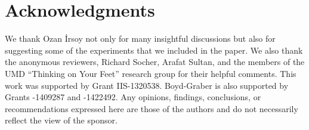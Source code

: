 \section*{Acknowledgments}
We thank Ozan \.Irsoy not only for many insightful discussions but
also for suggesting some of the experiments that we included in the
paper. We also thank the anonymous reviewers, Richard Socher, Arafat
Sultan, and the members of the UMD ``Thinking on Your Feet'' research
group for their helpful comments. This work was supported by 
Grant IIS-1320538.  Boyd-Graber is also supported by  Grants
-1409287 and -1422492.  Any opinions, findings,
conclusions, or recommendations expressed here are those of the
authors and do not necessarily reflect the view of the sponsor.
